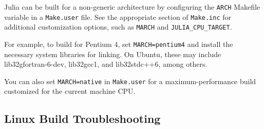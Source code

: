 Julia can be built for a non-generic architecture by configuring the \texttt{ARCH} Makefile variable in a \texttt{Make.user} file. See the appropriate section of \texttt{Make.inc} for additional customization options, such as \texttt{MARCH} and \texttt{JULIA\_CPU\_TARGET}.



For example, to build for Pentium 4, set \texttt{MARCH=pentium4} and install the necessary system libraries for linking. On Ubuntu, these may include lib32gfortran-6-dev, lib32gcc1, and lib32stdc++6, among others.



You can also set \texttt{MARCH=native} in \texttt{Make.user} for a maximum-performance build customized for the current machine CPU.



\hypertarget{15149557091365000286}{}


\subsection{Linux Build Troubleshooting}




